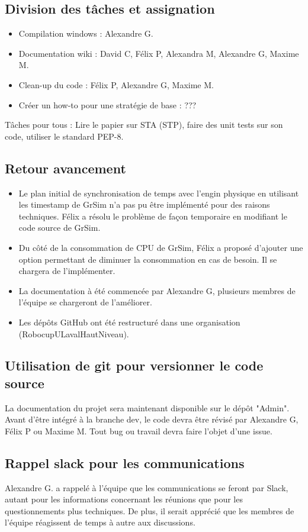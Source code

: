 \documentclass[12pt,letterpaper,twoside]{article}
\begin{document}
\subsection{Division des tâches et assignation}
\begin{itemize}
	\item Compilation windows : Alexandre G.
	\item Documentation wiki : David C, Félix P, Alexandra M, Alexandre G, Maxime M.
	\item Clean-up du code : Félix P, Alexandre G, Maxime M.
	\item Créer un how-to pour une stratégie de base : ???
\end{itemize}
Tâches pour tous : Lire le papier sur STA (STP), faire des unit tests sur son code, utiliser le standard PEP-8.

\subsection*{Retour avancement}
\begin{itemize}
	\item Le plan initial de synchronisation de temps avec l'engin physique en utilisant les timestamp de GrSim n'a pas pu être implémenté pour des raisons techniques. Félix a résolu le problème de façon temporaire en modifiant le code source de GrSim.
	\item Du côté de la consommation de CPU de GrSim, Félix a proposé d'ajouter une option permettant de diminuer la consommation en cas de besoin. Il se chargera de l'implémenter.
	\item La documentation à été commencée par Alexandre G, plusieurs membres de l'équipe se chargeront de l'améliorer.
	\item Les dépôts GitHub ont été restructuré dans une organisation (RobocupULavalHautNiveau). 
\end{itemize}

\subsection*{Utilisation de git pour versionner le code source}
La documentation du projet sera maintenant disponible sur le dépôt "Admin".
Avant d'être intégré à la branche dev, le code devra être révisé par Alexandre G, Félix P ou Maxime M.
Tout bug ou travail devra faire l'objet d'une issue.

\subsection*{Rappel slack pour les communications}
Alexandre G. a rappelé à l'équipe que les communications se feront par Slack, autant pour les informations concernant les réunions que pour les questionnements plus techniques.
De plus, il serait apprécié que les membres de l'équipe réagissent de temps à autre aux discussions.
\end{document}
